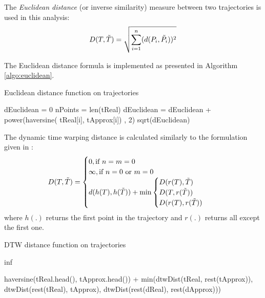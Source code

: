 The \textit{Euclidean distance} (or inverse similarity) measure between two trajectories is used in this analysis:
\[D(T,\Tilde{T}) = \sqrt{\sum_{i=1}^{n} (d(P_{i},\Tilde{P_{i}}))^{2}}\]

The Euclidean distance formula is implemented as presented in Algorithm \ref{algo:euclidean}.

\begin{algorithm}
\begin{algorithmic}
\caption{Euclidean distance function on trajectories} \label{algo:euclidean}
\State dEuclidean = 0
\State nPoints = len(tReal) 
    \State dEuclidean = dEuclidean + power(haversine(     
    \State tReal[i], tApprox[i]) , 2)
\EndFor
\Return sqrt(dEuclidean)
\EndFunction
\end{algorithmic}
\end{algorithm}

The dynamic time warping distance is calculated similarly to the formulation given in \cite{traj-sim-rev}:
    \[
        D(T,\Tilde{T}) =
        \begin{cases}
            0, \text{if } n=m=0 \\
            \infty,\text{if }  n=0 \text{ or } m=0 \\
            d(h(T), h(\Tilde{T})) + \min 
            \begin{cases}  
                D(r(T),\Tilde{T}) \\
                D(T,r(\Tilde{T})) \\
                D(r(T),r(\Tilde{T})) 
            \end{cases}
        \end{cases}
    \]
where $h(.)$ returns the first point in the trajectory and $r(.)$ returns all except the first one.


\begin{algorithm}
\begin{algorithmic}
\caption{DTW distance function on trajectories} \label{algo:euclidean}
        \State{}
    \EndIf
        \State\Return inf
    \EndIf

    \Return haversine(tReal.head(), tApprox.head()) + \State min(dtwDist(tReal, rest(tApprox)),     
    \State dtwDist(rest(tReal), tApprox), 
    \State dtwDist(rest(dReal), rest(dApprox)))
\EndFunction
\end{algorithmic}
\end{algorithm}

